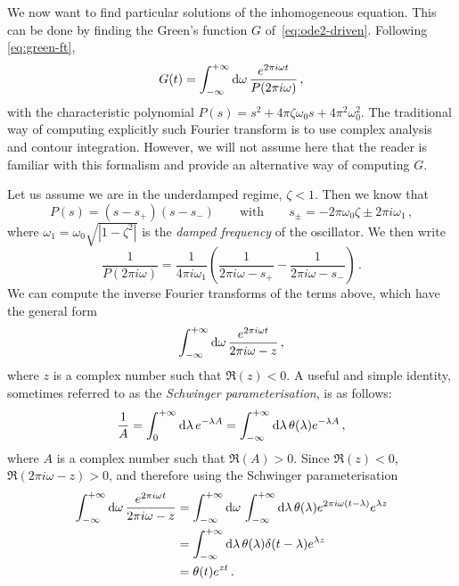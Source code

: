 We now want to find particular solutions of the inhomogeneous equation. This can be done
by finding the Green's function $G$ of~\cref{eq:ode2-driven}. Following
\cref{eq:green-ft},
\begin{equation}
  G(t)=\int_{-\infty}^{+\infty}\mathrm{d}{\omega}\,\frac{e^{2\pi i\omega t}}{P(2\pi i\omega)}\,,
\end{equation}
with the characteristic polynomial $P(s)=s^2+4\pi\zeta\omega_0s+4\pi^2\omega_0^2$. The
traditional way of computing explicitly such Fourier transform is to use complex analysis
and contour integration. However, we will not assume here that the reader is familiar with
this formalism and provide an alternative way of computing $G$.

Let us assume we are in the underdamped regime, \ie $\zeta<1$. Then we know that
\begin{equation}
  P(s)=(s-s_+)(s-s_-)\qquad\text{with}\qquad
  s_\pm=-2\pi\omega_0\zeta\pm 2\pi i\omega_1\,,
\end{equation}
where $\omega_1=\omega_0\sqrt{|1-\zeta^2|}$ is the \emph{damped frequency} of the
oscillator. We then write
\begin{equation}
  \frac{1}{P(2\pi i\omega)}=\frac{1}{4\pi i\omega_1}\left(\frac{1}{2\pi i\omega-s_+}
  -\frac{1}{2\pi i\omega-s_-}\right)\,.
  \label{eq:p-part-frac}
\end{equation}
We can compute the inverse Fourier transforms of the terms above, which have the general
form
\begin{equation}
  \int_{-\infty}^{+\infty}\mathrm{d}{\omega}\,\frac{e^{2\pi i\omega t}}{2\pi i \omega-z}\,,
\end{equation}
where $z$ is a complex number such that $\Re(z)<0$. A useful and simple identity,
sometimes referred to as the \emph{Schwinger parameterisation}, is as follows:
\begin{equation}
  \frac{1}{A}=\int_0^{+\infty}\mathrm{d}\lambda\,e^{-\lambda A}
  =\int_{-\infty}^{+\infty}\mathrm{d}{\lambda}\,\theta(\lambda)e^{-\lambda A}\,,
\end{equation}
where $A$ is a complex number such that $\Re(A)>0$. Since $\Re(z)<0$, $\Re(2\pi i
  \omega-z)>0$, and therefore using the Schwinger parameterisation
\begin{align}
  \int_{-\infty}^{+\infty}\mathrm{d}{\omega}\,\frac{e^{2\pi i\omega t}}{2\pi i \omega-z}
   & =
  \int_{-\infty}^{+\infty}\mathrm{d}{\omega}\,\int_{-\infty}^{+\infty}\mathrm{d}{\lambda}\,\theta(\lambda)
  e^{2\pi i\omega(t-\lambda)}e^{\lambda z}\notag                        \\
   & =\int_{-\infty}^{+\infty}\mathrm{d}{\lambda}\,\theta(\lambda)\delta(t-\lambda)e^{\lambda z}\notag \\
   & =\theta(t)e^{zt}\,.
  \label{eq:thetaexp}
\end{align}
